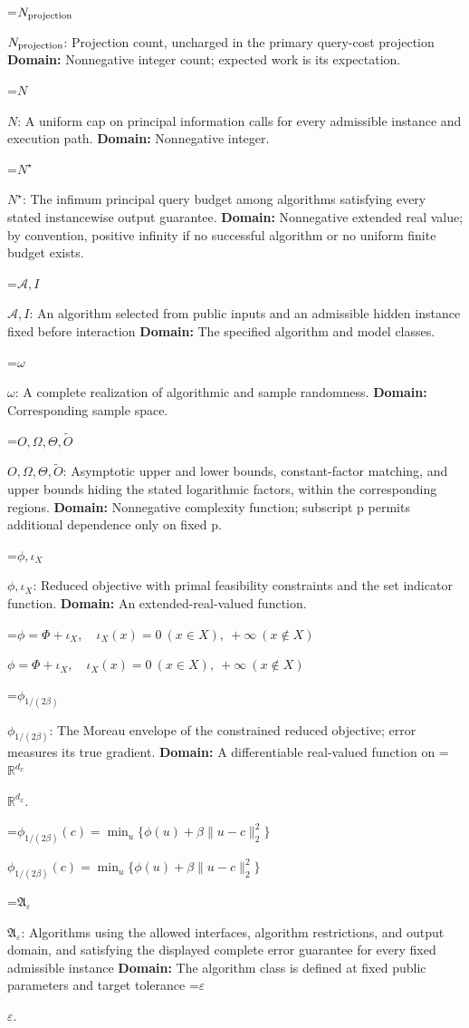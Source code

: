 \documentclass[10pt,a4paper]{article}
\newcommand{\AtlasMath}[1]{\par\begingroup\centering\setbox0=\hbox{$\displaystyle #1$}\ifdim\wd0>1.4\linewidth\typeout{ATLAS WIDE FORMULA: \the\wd0}\fi\ifdim\wd0>\linewidth\resizebox{\linewidth}{!}{\box0}\else\box0\fi\par\endgroup}
\newcommand{\AtlasInlineMath}[1]{\begingroup\setbox0=\hbox{$#1$}\ifdim\wd0>.4\linewidth\endgroup\AtlasMath{#1}\else\endgroup$#1$\fi}
\begin{document}
\AtlasInlineMath{N_{\rm projection}}: Projection count, uncharged in the primary query-cost projection \textbf{Domain:} Nonnegative integer count; expected work is its expectation.

\AtlasInlineMath{N}: A uniform cap on principal information calls for every admissible instance and execution path. \textbf{Domain:} Nonnegative integer.

\AtlasInlineMath{N^\star}: The infimum principal query budget among algorithms satisfying every stated instancewise output guarantee. \textbf{Domain:} Nonnegative extended real value; by convention, positive infinity if no successful algorithm or no uniform finite budget exists.

\AtlasInlineMath{\mathcal A,I}: An algorithm selected from public inputs and an admissible hidden instance fixed before interaction \textbf{Domain:} The specified algorithm and model classes.

\AtlasInlineMath{\omega}: A complete realization of algorithmic and sample randomness. \textbf{Domain:} Corresponding sample space.

\AtlasInlineMath{O,\Omega,\Theta,\widetilde O}: Asymptotic upper and lower bounds, constant-factor matching, and upper bounds hiding the stated logarithmic factors, within the corresponding regions. \textbf{Domain:} Nonnegative complexity function; subscript p permits additional dependence only on fixed p.

\AtlasInlineMath{\phi,\iota_X}: Reduced objective with primal feasibility constraints and the set indicator function. \textbf{Domain:} An extended-real-valued function.

\AtlasInlineMath{\phi=\Phi+\iota_X,\quad\iota_X(x)=0\ (x\in X),\ +\infty\ (x\notin X)}

\AtlasInlineMath{\phi_{1/(2\beta)}}: The Moreau envelope of the constrained reduced objective; error measures its true gradient. \textbf{Domain:} A differentiable real-valued function on \AtlasInlineMath{\mathbb R^{d_x}}.

\AtlasInlineMath{\phi_{1/(2\beta)}(c)=\min_u\{\phi(u)+\beta\|u-c\|_2^2\}}

\AtlasInlineMath{\mathfrak A_\varepsilon}: Algorithms using the allowed interfaces, algorithm restrictions, and output domain, and satisfying the displayed complete error guarantee for every fixed admissible instance \textbf{Domain:} The algorithm class is defined at fixed public parameters and target tolerance \AtlasInlineMath{\varepsilon}.
\end{document}
